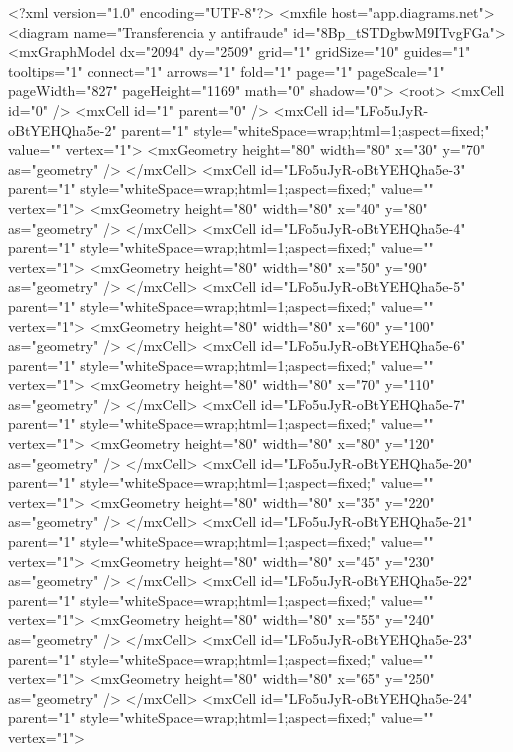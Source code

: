 <?xml version="1.0" encoding="UTF-8"?>
<mxfile host="app.diagrams.net">
  <diagram name="Transferencia y antifraude" id="8Bp_tSTDgbwM9ITvgFGa">
    <mxGraphModel dx="2094" dy="2509" grid="1" gridSize="10" guides="1" tooltips="1" connect="1" arrows="1" fold="1" page="1" pageScale="1" pageWidth="827" pageHeight="1169" math="0" shadow="0">
      <root>
        <mxCell id="0" />
        <mxCell id="1" parent="0" />
        <mxCell id="LFo5uJyR-oBtYEHQha5e-2" parent="1" style="whiteSpace=wrap;html=1;aspect=fixed;" value="" vertex="1">
          <mxGeometry height="80" width="80" x="30" y="70" as="geometry" />
        </mxCell>
        <mxCell id="LFo5uJyR-oBtYEHQha5e-3" parent="1" style="whiteSpace=wrap;html=1;aspect=fixed;" value="" vertex="1">
          <mxGeometry height="80" width="80" x="40" y="80" as="geometry" />
        </mxCell>
        <mxCell id="LFo5uJyR-oBtYEHQha5e-4" parent="1" style="whiteSpace=wrap;html=1;aspect=fixed;" value="" vertex="1">
          <mxGeometry height="80" width="80" x="50" y="90" as="geometry" />
        </mxCell>
        <mxCell id="LFo5uJyR-oBtYEHQha5e-5" parent="1" style="whiteSpace=wrap;html=1;aspect=fixed;" value="" vertex="1">
          <mxGeometry height="80" width="80" x="60" y="100" as="geometry" />
        </mxCell>
        <mxCell id="LFo5uJyR-oBtYEHQha5e-6" parent="1" style="whiteSpace=wrap;html=1;aspect=fixed;" value="" vertex="1">
          <mxGeometry height="80" width="80" x="70" y="110" as="geometry" />
        </mxCell>
        <mxCell id="LFo5uJyR-oBtYEHQha5e-7" parent="1" style="whiteSpace=wrap;html=1;aspect=fixed;" value="" vertex="1">
          <mxGeometry height="80" width="80" x="80" y="120" as="geometry" />
        </mxCell>
        <mxCell id="LFo5uJyR-oBtYEHQha5e-20" parent="1" style="whiteSpace=wrap;html=1;aspect=fixed;" value="" vertex="1">
          <mxGeometry height="80" width="80" x="35" y="220" as="geometry" />
        </mxCell>
        <mxCell id="LFo5uJyR-oBtYEHQha5e-21" parent="1" style="whiteSpace=wrap;html=1;aspect=fixed;" value="" vertex="1">
          <mxGeometry height="80" width="80" x="45" y="230" as="geometry" />
        </mxCell>
        <mxCell id="LFo5uJyR-oBtYEHQha5e-22" parent="1" style="whiteSpace=wrap;html=1;aspect=fixed;" value="" vertex="1">
          <mxGeometry height="80" width="80" x="55" y="240" as="geometry" />
        </mxCell>
        <mxCell id="LFo5uJyR-oBtYEHQha5e-23" parent="1" style="whiteSpace=wrap;html=1;aspect=fixed;" value="" vertex="1">
          <mxGeometry height="80" width="80" x="65" y="250" as="geometry" />
        </mxCell>
        <mxCell id="LFo5uJyR-oBtYEHQha5e-24" parent="1" style="whiteSpace=wrap;html=1;aspect=fixed;" value="" vertex="1">
